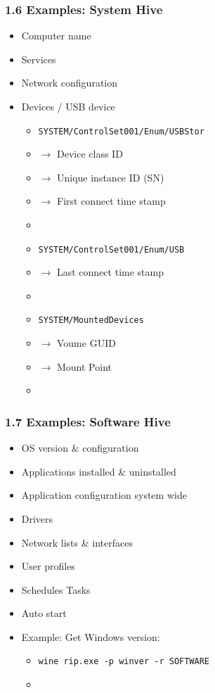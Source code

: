 \begin{frame}[fragile]
  \frametitle{1.6 Examples: System Hive}
   \begin{itemize}
      \item Computer name
      \item Services
      \item Network configuration
      \item Devices / USB device
      \begin{itemize}
	  \item \texttt{\scriptsize{SYSTEM/ControlSet001/Enum/USBStor}}
	  \item[] $\to$ Device class ID
	  \item[] $\to$ Unique instance ID (SN)
	  \item[] $\to$ First connect time stamp
	  \item[]
	  \item \texttt{\scriptsize{SYSTEM/ControlSet001/Enum/USB}}
	  \item[] $\to$ Last connect time stamp
	  \item[]
	  \item \texttt{\scriptsize{SYSTEM/MountedDevices}}
	  \item[] $\to$ Voume GUID
	  \item[] $\to$ Mount Point
	  \item[]
      \end{itemize}
   \end{itemize}
\end{frame}


\begin{frame}[fragile]
  \frametitle{1.7 Examples: Software Hive}
   \begin{itemize}
      \item OS version \& configuration
      \item Applications installed \& uninstalled
      \item Application configuration system wide
      \item Drivers
      \item Network lists \& interfaces
      \item User profiles
      \item Schedules Tasks
      \item Auto start
      \item Example: Get Windows version:
      \begin{itemize}
	  \item \texttt{\scriptsize{wine rip.exe -p winver -r SOFTWARE}}
	  \item[]
      \end{itemize}
   \end{itemize}
\end{frame}


